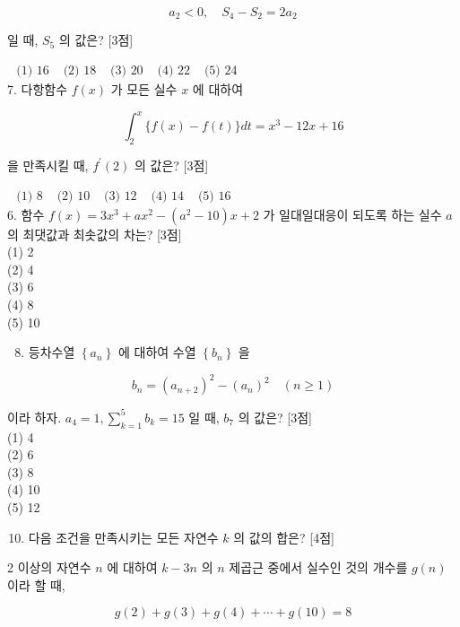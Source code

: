 \documentclass[10pt]{article}
\begin{document}
\[
a_{2}<0, \quad S_{4}-S_{2}=2 a_{2}
\]

일 때, \(S_{5}\) 의 값은? [3점]

\(\begin{array}{lllll}\text { (1) } 16 & \text { (2) } 18 & \text { (3) } 20 & \text { (4) } 22 & \text { (5) } 24\end{array}\)\\
7. 다항함수 \(f(x)\) 가 모든 실수 \(x\) 에 대하여

\[
\int_{2}^{x}\{f(x)-f(t)\} d t=x^{3}-12 x+16
\]

을 만족시킬 때, \(f^{\prime}(2)\) 의 값은? [3점]

\(\begin{array}{lllll}\text { (1) } 8 & \text { (2) } 10 & \text { (3) } 12 & \text { (4) } 14 & \text { (5) } 16\end{array}\)\\
6. 함수 \(f(x)=3 x^{3}+a x^{2}-\left(a^{2}-10\right) x+2\) 가 일대일대응이 되도록 하는 실수 \(a\) 의 최댓값과 최솟값의 차는? [3점]\\
(1) 2\\
(2) 4\\
(3) 6\\
(4) 8\\
(5) 10

\begin{enumerate}
  \setcounter{enumi}{7}
  \item 등차수열 \(\left\{a_{n}\right\}\) 에 대하여 수열 \(\left\{b_{n}\right\}\) 을
\end{enumerate}

\[
b_{n}=\left(a_{n+2}\right)^{2}-\left(a_{n}\right)^{2} \quad(n \geq 1)
\]

이라 하자. \(a_{4}=1, \sum_{k=1}^{5} b_{k}=15\) 일 때, \(b_{7}\) 의 값은? [3점]\\
(1) 4\\
(2) 6\\
(3) 8\\
(4) 10\\
(5) 12

\begin{enumerate}
  \setcounter{enumi}{9}
  \item 다음 조건을 만족시키는 모든 자연수 \(k\) 의 값의 합은? [4점]
\end{enumerate}

2 이상의 자연수 \(n\) 에 대하여 \(k-3 n\) 의 \(n\) 제곱근 중에서 실수인 것의 개수를 \(g(n)\) 이라 할 때,

\[
g(2)+g(3)+g(4)+\cdots+g(10)=8
\]
\end{document}
